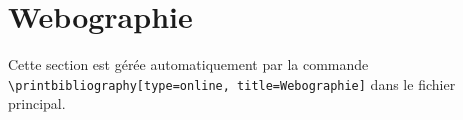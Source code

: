 \chapter*{Webographie}
Cette section est gérée automatiquement par la commande \texttt{\textbackslash printbibliography[type=online, title=Webographie]} dans le fichier principal.\newline

